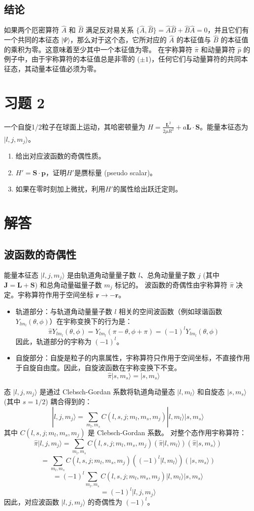 \documentclass[12pt, a4paper]{article}
\begin{document}
\subsection{结论}
如果两个厄密算符 \(\hat{A}\) 和 \(\hat{B}\) 满足反对易关系 \(\{\hat{A}, \hat{B}\} = \hat{A}\hat{B} + \hat{B}\hat{A} = 0\)，并且它们有一个共同的本征态 \(|\Psi\rangle\)，那么对于这个态，它所对应的 \(\hat{A}\) 的本征值与 \(\hat{B}\) 的本征值的乘积为零。这意味着至少其中一个本征值为零。
在宇称算符 \(\hat{\pi}\) 和动量算符 \(\hat{p}\) 的例子中，由于宇称算符的本征值总是非零的 (\(\pm 1\))，任何它们与动量算符的共同本征态，其动量本征值必须为零。

\section*{习题 2}
一个自旋1/2粒子在球面上运动，其哈密顿量为 $H = \frac{\mathbf{L}^2}{2\mu R^2} + a\mathbf{L}\cdot\mathbf{S}$。能量本征态为 $|l, j, m_j\rangle$。
\begin{enumerate}
    \item 给出对应波函数的奇偶性质。
    \item $H' = \mathbf{S} \cdot \mathbf{p}$，证明$H'$是赝标量 (pseudo scalar)。
    \item 如果在零时刻加上微扰，利用$H'$的属性给出跃迁定则。
\end{enumerate}
\section{解答}
\subsection{波函数的奇偶性}
能量本征态 \(|l, j, m_j\rangle\) 是由轨道角动量量子数 \(l\)、总角动量量子数 \(j\) (其中 \(\mathbf{J} = \mathbf{L} + \mathbf{S}\)) 和总角动量磁量子数 \(m_j\) 标记的。
波函数的奇偶性由宇称算符 \(\hat{\pi}\) 决定。宇称算符作用于空间坐标 \(\mathbf{r} \rightarrow -\mathbf{r}\)。
\begin{itemize}
    \item 轨道部分：与轨道角动量量子数 \(l\) 相关的空间波函数（例如球谐函数 \(Y_{lm_l}(\theta, \phi)\)）在宇称变换下的行为是：
    \[ \hat{\pi} Y_{lm_l}(\theta, \phi) = Y_{lm_l}(\pi-\theta, \phi+\pi) = (-1)^l Y_{lm_l}(\theta, \phi) \]
    因此，轨道部分的宇称为 \((-1)^l\)。
    \item 自旋部分：自旋是粒子的内禀属性，宇称算符只作用于空间坐标，不直接作用于自旋自由度。因此，自旋波函数在宇称变换下不变。
    \[ \hat{\pi} |s, m_s\rangle = |s, m_s\rangle \]
\end{itemize}
态 \(|l, j, m_j\rangle\) 是通过 Clebsch-Gordan 系数将轨道角动量态 \(|l, m_l\rangle\) 和自旋态 \(|s, m_s\rangle\) (其中 \(s=1/2\)) 耦合得到的：
\[ |l, j, m_j\rangle = \sum_{m_l, m_s} C(l,s,j; m_l,m_s,m_j) |l, m_l\rangle |s, m_s\rangle \]
其中 \(C(l,s,j; m_l,m_s,m_j)\) 是 Clebsch-Gordan 系数。
对整个态作用宇称算符：
\[ \hat{\pi} |l, j, m_j\rangle = \sum_{m_l, m_s} C(l,s,j; m_l,m_s,m_j) (\hat{\pi}|l, m_l\rangle) (\hat{\pi}|s, m_s\rangle) \]
\[ = \sum_{m_l, m_s} C(l,s,j; m_l,m_s,m_j) ((-1)^l|l, m_l\rangle) (|s, m_s\rangle) \]
\[ = (-1)^l \sum_{m_l, m_s} C(l,s,j; m_l,m_s,m_j) |l, m_l\rangle |s, m_s\rangle \]
\[ = (-1)^l |l, j, m_j\rangle \]
因此，对应波函数 \(|l, j, m_j\rangle\) 的奇偶性为 \((-1)^l\)。
\end{document}
